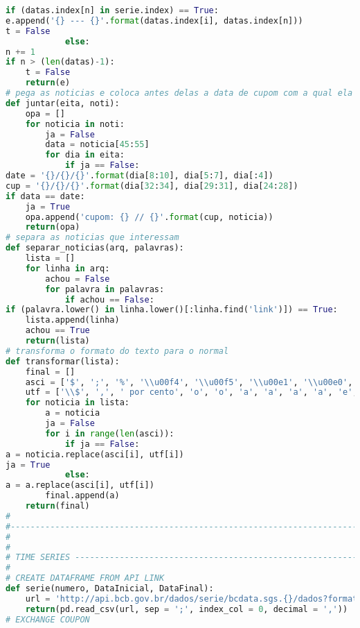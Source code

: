 \begin{lstlisting}[language=Python]
            if (datas.index[n] in serie.index) == True:
e.append('{} --- {}'.format(datas.index[i], datas.index[n]))
t = False
            else:
n += 1
if n > (len(datas)-1):
    t = False
    return(e)
# pega as noticias e coloca antes delas a data de cupom com a qual ela é relacionada
def juntar(eita, noti):
    opa = []
    for noticia in noti:
        ja = False
        data = noticia[45:55]
        for dia in eita:
            if ja == False:
date = '{}/{}/{}'.format(dia[8:10], dia[5:7], dia[:4])
cup = '{}/{}/{}'.format(dia[32:34], dia[29:31], dia[24:28])
if data == date:
    ja = True
    opa.append('cupom: {} // {}'.format(cup, noticia))
    return(opa)
# separa as noticias que interessam
def separar_noticias(arq, palavras):
    lista = []
    for linha in arq:
        achou = False
        for palavra in palavras:
            if achou == False:
if (palavra.lower() in linha.lower()[:linha.find('link')]) == True:
    lista.append(linha)
    achou == True
    return(lista)
# transforma o formato do texto para o normal
def transformar(lista):
    final = []
    asci = ['$', ';', '%', '\\u00f4', '\\u00f5', '\\u00e1', '\\u00e0', '\\u00e3', '\\u00e2', '\\u00e9', '\\u00ea', '\\u00ed', '\\u00f3', '\\u00fa', '\\u00e7']
    utf = ['\\$', ',', ' por cento', 'o', 'o', 'a', 'a', 'a', 'a', 'e', 'e', 'i', 'o', 'u', 'c']
    for noticia in lista:
        a = noticia
        ja = False
        for i in range(len(asci)):
            if ja == False:
a = noticia.replace(asci[i], utf[i])
ja = True
            else:
a = a.replace(asci[i], utf[i])
        final.append(a)
    return(final)
#
#----------------------------------------------------------------------SCRAPPING
#
#
# TIME SERIES ------------------------------------------------------------------
#
# CREATE DATAFRAME FROM API LINK
def serie(numero, DataInicial, DataFinal):
    url = 'http://api.bcb.gov.br/dados/serie/bcdata.sgs.{}/dados?formato=csv&&dataInicial={}&dataFinal={}'.format(numero, data_inicial, data_final)
    return(pd.read_csv(url, sep = ';', index_col = 0, decimal = ','))
# EXCHANGE COUPON

\end{lstlisting}
